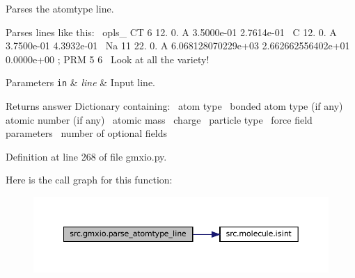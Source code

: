 Parses the \textquotesingle{}atomtype\textquotesingle{} line. 

Parses lines like this\+:~\newline
 {\ttfamily  opls\+\_ CT 6 12. 0. A 3.\+5000e-\/01 2.\+7614e-\/01~\newline
 C 12. 0. A 3.\+7500e-\/01 4.\+3932e-\/01~\newline
 Na 11 22. 0. A 6.\+068128070229e+03 2.\+662662556402e+01 0.\+0000e+00 ; P\+RM 5 6~\newline
 } Look at all the variety!


\begin{DoxyParams}[1]{Parameters}
\mbox{\tt in}  & {\em line} & Input line. \\
\hline
\end{DoxyParams}
\begin{DoxyReturn}{Returns}
answer Dictionary containing\+:~\newline
 atom type~\newline
 bonded atom type (if any)~\newline
 atomic number (if any)~\newline
 atomic mass~\newline
 charge~\newline
 particle type~\newline
 force field parameters~\newline
 number of optional fields 
\end{DoxyReturn}


Definition at line 268 of file gmxio.\+py.

Here is the call graph for this function\+:
\nopagebreak
\begin{figure}[H]
\begin{center}
\leavevmode
\includegraphics[width=350pt]{namespacesrc_1_1gmxio_ad77d69866b09dbe5830d9c5f7b48fe84_cgraph}
\end{center}
\end{figure}
\mbox{\label{namespacesrc_1_1gmxio_a7430b70092fa07b4cad7d894a6ade4f9}} 
